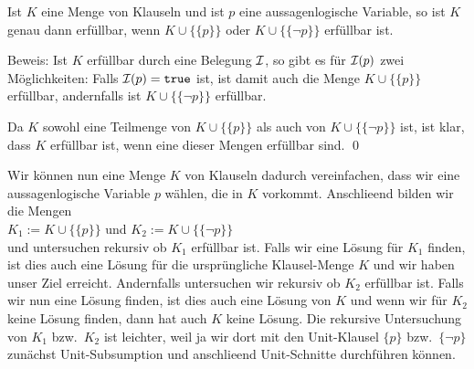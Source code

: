 \begin{Satz}
  Ist $K$ eine Menge von Klauseln und ist $p$ eine aussagenlogische Variable, 
  so ist $K$ genau dann erf\"{u}llbar, wenn $K \cup \bigl\{\{p\}\bigr\}$ oder 
  $K \cup \bigl\{\{\neg p\}\bigr\}$ erf\"{u}llbar ist.  
\end{Satz}
Beweis: 
Ist $K$ erf\"{u}llbar durch eine
Belegung $\mathcal{I}$, so gibt es f\"{u}r  $\mathcal{I}(p)$ zwei M\"{o}glichkeiten:  Falls $\mathcal{I}(p) = \mathtt{true}$ ist, ist
damit auch die Menge $K \cup \bigl\{\{p\}\bigr\}$ erf\"{u}llbar, andernfalls ist
$K \cup \bigl\{\{\neg p\}\bigr\}$ erf\"{u}llbar. 

Da $K$ sowohl eine Teilmenge von $K \cup \bigl\{\{p\}\bigr\}$ als auch von 
$K \cup \bigl\{\{\neg p\}\bigr\}$ ist, ist klar, dass $K$ erf\"{u}llbar
ist, wenn eine dieser Mengen erf\"{u}llbar sind.  
\qed

Wir k\"{o}nnen nun eine Menge $K$ von Klauseln dadurch vereinfachen, dass wir eine
aussagenlogische Variable $p$ w\"{a}hlen, die in $K$ vorkommt.
Anschlie\3end bilden wir die Mengen \\[0.2cm]
\hspace*{1.3cm} $K_1 := K \cup \bigl\{\{p\}\bigr\}$ \quad und \quad $K_2 := K \cup
\bigl\{\{\neg p\}\bigr\}$
\\[0.2cm]
und untersuchen rekursiv ob $K_1$ erf\"{u}llbar ist.  Falls wir eine L\"{o}sung f\"{u}r $K_1$ finden,
ist dies auch eine L\"{o}sung f\"{u}r die urspr\"{u}ngliche Klausel-Menge $K$ und wir haben unser Ziel
erreicht.
Andernfalls untersuchen wir rekursiv ob $K_2$ erf\"{u}llbar ist.
Falls wir nun eine L\"{o}sung finden, ist dies auch eine L\"{o}sung von $K$ und wenn wir f\"{u}r $K_2$
keine L\"{o}sung finden, dann hat auch $K$ keine L\"{o}sung.
Die rekursive Untersuchung von $K_1$ bzw.~$K_2$ ist leichter,
weil ja wir dort mit den Unit-Klausel $\{p\}$ bzw.~$\{\neg p\}$
zun\"{a}chst Unit-Subsumption und anschlie\3end Unit-Schnitte durchf\"{u}hren k\"{o}nnen.


